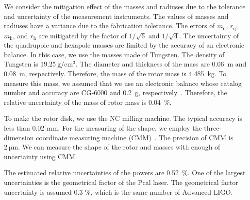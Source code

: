 \documentclass[%
 reprint,
superscriptaddress,
 amsmath,amssymb,
 aps,
]{revtex4-1}
\begin{document}
 We consider the mitigation effect of the masses and radiuses due to the tolerance and uncertainty of the measurement instruments. The values of masses and radiuses have a variance due to the fabrication tolerance. The errors of $m_{\mathrm{q}}$, $r_{\mathrm{q}}$, $m_{\mathrm{h}}$, and $r_{\mathrm{h}}$ are mitigated by the factor of $1/\sqrt{6}$ and $1/\sqrt{4}$. 
The uncertainty of the quadrupole and hexapole masses are limited by the accuracy of  an electronic balance. In this case, we use the masses made of Tungsten. The density of Tungsten is $19.25~\mathrm{g/cm^3}$. The diameter and thickness of the mass are 0.06~m and 0.08~m, respectively. Therefore, the mass of the rotor mass is 4.485~kg. To measure this mass, we assumed that we use an electronic balance whose catalog number and accuracy are CG-6000 and 0.2~g, respectively~\cite{CG6000}. Therefore, the relative uncertainty of the mass of rotor mass is 0.04~\%.

 To make the rotor disk, we use the NC milling machine. The typical accuracy is less than 0.02 mm. For the measuring of the shape, we employ the three-dimension coordinate measuring machine (CMM)~\cite{Inoue:2016kyq}. The precision of CMM is $2~\mathrm{\mu m}$. We can measure the shape of the rotor and masses with enough of uncertainty using CMM. 

The estimated relative uncertainties of the powers are 0.52~\%. One of the largest uncertainties is the geometrical factor of the Pcal laser. The geometrical factor uncertainty is assumed 0.3 \%, which is the same number of Advanced LIGO. 
\end{document}
